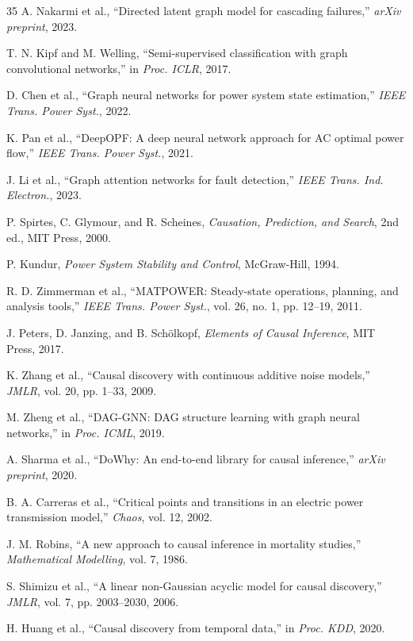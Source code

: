 \documentclass[journal,12pt,onecolumn]{IEEEtran}
\begin{document}
\begin{thebibliography}{35}
A. Nakarmi et al., ``Directed latent graph model for cascading failures,'' \emph{arXiv preprint}, 2023.

T. N. Kipf and M. Welling, ``Semi-supervised classification with graph convolutional networks,'' in \emph{Proc. ICLR}, 2017.

D. Chen et al., ``Graph neural networks for power system state estimation,'' \emph{IEEE Trans. Power Syst.}, 2022.

K. Pan et al., ``DeepOPF: A deep neural network approach for AC optimal power flow,'' \emph{IEEE Trans. Power Syst.}, 2021.

J. Li et al., ``Graph attention networks for fault detection,'' \emph{IEEE Trans. Ind. Electron.}, 2023.

P. Spirtes, C. Glymour, and R. Scheines, \emph{Causation, Prediction, and Search}, 2nd ed., MIT Press, 2000.

P. Kundur, \emph{Power System Stability and Control}, McGraw-Hill, 1994.

R. D. Zimmerman et al., ``MATPOWER: Steady-state operations, planning, and analysis tools,'' \emph{IEEE Trans. Power Syst.}, vol. 26, no. 1, pp. 12--19, 2011.

J. Peters, D. Janzing, and B. Schölkopf, \emph{Elements of Causal Inference}, MIT Press, 2017.

K. Zhang et al., ``Causal discovery with continuous additive noise models,'' \emph{JMLR}, vol. 20, pp. 1--33, 2009.

M. Zheng et al., ``DAG-GNN: DAG structure learning with graph neural networks,'' in \emph{Proc. ICML}, 2019.

A. Sharma et al., ``DoWhy: An end-to-end library for causal inference,'' \emph{arXiv preprint}, 2020.

B. A. Carreras et al., ``Critical points and transitions in an electric power transmission model,'' \emph{Chaos}, vol. 12, 2002.

J. M. Robins, ``A new approach to causal inference in mortality studies,'' \emph{Mathematical Modelling}, vol. 7, 1986.

S. Shimizu et al., ``A linear non-Gaussian acyclic model for causal discovery,'' \emph{JMLR}, vol. 7, pp. 2003--2030, 2006.

H. Huang et al., ``Causal discovery from temporal data,'' in \emph{Proc. KDD}, 2020.


\end{thebibliography}
\end{document}
